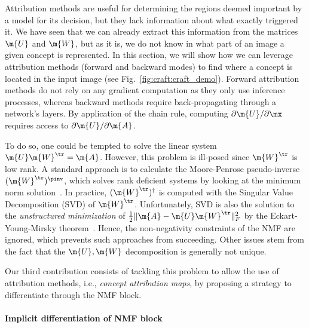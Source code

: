 Attribution methods are useful for determining the regions deemed important by a model for its decision, but they lack information about what exactly triggered it.
We have seen that we can already extract this information from the matrices $\m{U}$ and $\m{W}$, but as it is, we do not know in what part of an image a given concept is represented.
In this section, we will show how we can leverage attribution methods (forward and backward modes) to find where a concept is located in the input image (see Fig.~\ref{fig:craft:craft_demo}). Forward attribution methods do not rely on any gradient computation as they only use inference processes, whereas backward methods require back-propagating through a network's layers. By application of the chain rule, computing $\partial \m{U} / \partial \mx$ requires access to $\partial \m{U} /\partial \m{A}$.  





To do so, one could be tempted to solve the linear system $\m{U}\m{W}^\tr=\m{A}$. 
However, this problem is ill-posed since $\m{W}^\tr$ is low rank. A standard approach is to calculate the Moore-Penrose pseudo-inverse $(\m{W}^\tr)^\pinv$, which solves rank deficient systems by looking at the minimum norm solution~\cite{barata2012moore}. In practice, $(\m{W}^\tr)^{\dagger}$ is computed with the Singular Value Decomposition (SVD) of $\m{W}^\tr$. Unfortunately, SVD is also the solution to the \textit{unstructured minimization} of $\frac{1}{2}\|\m{A}-\m{U}\m{W}^\tr\|^2_F$ by the Eckart-\-Young-\-Mirsky theorem~\cite{eckart1936approximation}. Hence, the non-negativity constraints of the NMF are ignored, which prevents such approaches from succeeding. Other issues stem from the fact that the $\m{U},\m{W}$ decomposition is generally not unique.



Our third contribution consists of tackling this problem to allow the use of attribution methods, i.e., \textit{concept attribution maps}, by proposing a strategy to differentiate through the NMF block.

\paragraph{Implicit differentiation of NMF block}


